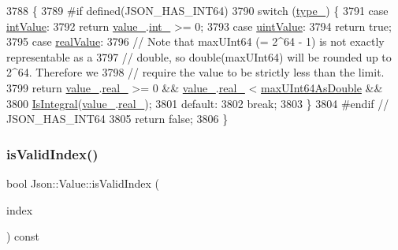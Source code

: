 \begin{DoxyCode}
3788                            \{
3789 \textcolor{preprocessor}{#if defined(JSON\_HAS\_INT64)}
3790   \textcolor{keywordflow}{switch} (\hyperlink{class_json_1_1_value_abd222c2536dc88bf330dedcd076d2356}{type\_}) \{
3791   \textcolor{keywordflow}{case} \hyperlink{namespace_json_a7d654b75c16a57007925868e38212b4eae5a9d708d5c9e23ae9bf98898522512d}{intValue}:
3792     \textcolor{keywordflow}{return} \hyperlink{class_json_1_1_value_aef578244546212705b9f81eb84d7e151}{value\_}.\hyperlink{union_json_1_1_value_1_1_value_holder_adbfb384301298844ed955ba5cf6015a0}{int\_} >= 0;
3793   \textcolor{keywordflow}{case} \hyperlink{namespace_json_a7d654b75c16a57007925868e38212b4eaea788d9a3bb00adc6d68d97d43e1ccd3}{uintValue}:
3794     \textcolor{keywordflow}{return} \textcolor{keyword}{true};
3795   \textcolor{keywordflow}{case} \hyperlink{namespace_json_a7d654b75c16a57007925868e38212b4eab837c7b869c14d8be712deb45c9e490e}{realValue}:
3796     \textcolor{comment}{// Note that maxUInt64 (= 2^64 - 1) is not exactly representable as a}
3797     \textcolor{comment}{// double, so double(maxUInt64) will be rounded up to 2^64. Therefore we}
3798     \textcolor{comment}{// require the value to be strictly less than the limit.}
3799     \textcolor{keywordflow}{return} \hyperlink{class_json_1_1_value_aef578244546212705b9f81eb84d7e151}{value\_}.\hyperlink{union_json_1_1_value_1_1_value_holder_af0c5ca724e5fe3a15db773d750e2351e}{real\_} >= 0 && \hyperlink{class_json_1_1_value_aef578244546212705b9f81eb84d7e151}{value\_}.\hyperlink{union_json_1_1_value_1_1_value_holder_af0c5ca724e5fe3a15db773d750e2351e}{real\_} < 
      \hyperlink{namespace_json_aecc0306aa526f25c5156f842182fb7fb}{maxUInt64AsDouble} &&
3800            \hyperlink{namespace_json_a1a04cc9d31e64b5912dade003c9b99b5}{IsIntegral}(\hyperlink{class_json_1_1_value_aef578244546212705b9f81eb84d7e151}{value\_}.\hyperlink{union_json_1_1_value_1_1_value_holder_af0c5ca724e5fe3a15db773d750e2351e}{real\_});
3801   \textcolor{keywordflow}{default}:
3802     \textcolor{keywordflow}{break};
3803   \}
3804 \textcolor{preprocessor}{#endif // JSON\_HAS\_INT64}
3805   \textcolor{keywordflow}{return} \textcolor{keyword}{false};
3806 \}
\end{DoxyCode}
\mbox{\label{class_json_1_1_value_ac2928f174a6e081c1500c28c2d61ee93}} 
\subsubsection{\texorpdfstring{is\+Valid\+Index()}{isValidIndex()}}
{\footnotesize\ttfamily bool Json\+::\+Value\+::is\+Valid\+Index (\begin{DoxyParamCaption}\item[{\hyperlink{class_json_1_1_value_a184a91566cccca7b819240f0d5561c7d}{Array\+Index}}]{index }\end{DoxyParamCaption}) const}



